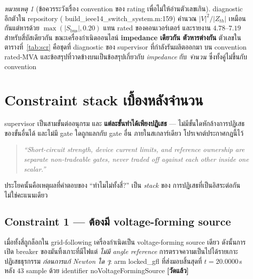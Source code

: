 \documentclass[12pt,a4paper]{article}
\theoremstyle{remark}
\newtheorem{remark}{หมายเหตุ}
\newcommand{\code}[1]{{\ttfamily\small\hyphenchar\font=-1 #1}}
\newcommand{\measured}{\textcolor{ok}{\textbf{[วัดแล้ว]}}}
\begin{document}
\begin{remark}[ข้อควรระวังเรื่อง convention ของ rating เพื่อไม่ให้อ่านตัวเลขเกิน]
diagnostic อีกตัวใน repository (\code{build\_ieee14\_switch\_system.m:159})
คำนวณ $|V|^2/|Z_{th}|$ เหมือนกันแต่หารด้วย $\max(|S_{\text{bus}}|,0.20)$
แทน rated ของคอนเวอร์เตอร์ และรายงาน $4.78$--$7.19$ สำหรับสี่บัสเดียวกัน
ขณะเครื่องกำเนิดออนไลน์ \textbf{impedance เดียวกัน ตัวหารต่างกัน} ตัวเลขใน
ตารางที่~\ref{tab:scr} คือชุดที่ diagnostic ของ supervisor ที่กำลังรันผลิตออกมา
บน convention rated-MVA และข้อสรุปที่วาดข้างบนเป็นข้อสรุปเกี่ยวกับ
\emph{impedance} กับ \emph{จำนวน} ซึ่งทั้งคู่ไม่ขึ้นกับ convention
\end{remark}

\section{Constraint stack เบื้องหลังจำนวน}\label{sec:constraints}

supervisor เป็นสามขั้นต่ออนุกรม และ \textbf{แต่ละขั้นทำได้เพียงปฏิเสธ} ---
ไม่มีขั้นใดหักล้างการปฏิเสธของขั้นอื่นได้ และไม่มี gate ใดถูกแลกกับ gate อื่น
ภายในสเกลาร์เดียว โปรเจกต์ประกาศกฎนี้ไว้

\begin{quote}\small\itshape
``Short-circuit strength, device current limits, and reference ownership are
separate non-tradeable gates, never traded off against each other inside one
scalar.''\par
\raggedleft\normalfont\code{(README.md:84--86)}\par
\end{quote}

ประโยคนั้นคือเหตุผลที่คำตอบของ ``ทำไมไม่ทั้งสี่?'' เป็น \emph{stack} ของ
การปฏิเสธที่เป็นอิสระต่อกัน ไม่ใช่คะแนนเดียว

\subsection{Constraint 1 --- ต้องมี voltage-forming source}

เมื่อทั้งสี่ถูกล็อกใน grid-following เครื่องกำเนิดเป็น voltage-forming source
เดียว ดังนั้นการเปิด breaker ของมันทิ้งเกาะที่มีไฟแต่ \emph{ไม่มี angle
reference} การตรวจความเป็นไปได้รายเกาะปฏิเสธธุรกรรม \emph{ก่อนการแก้ Newton
ใด ๆ}: arm \code{locked\_gfl} ที่ส่งมอบสิ้นสุดที่ $t=20.0000$\,s หลัง $43$
sample ด้วย identifier \code{noVoltageFormingSource} \measured
\end{document}
